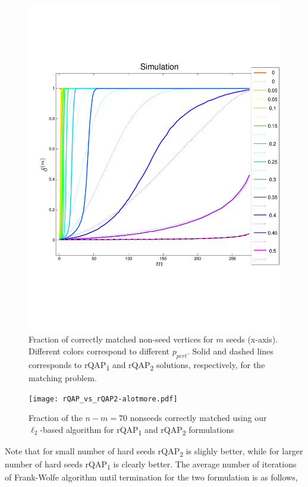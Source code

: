 \documentclass[12pt,oneside,final]{thesis}\usepackage[]{graphicx}\usepackage[]{color}
\begin{document}
\begin{figure}
 \centering
  \caption{ Fraction of correctly matched non-seed vertices for $m$ seeds (x-axis). Different colors correspond to different  $p_{pert}$. Solid and dashed lines corresponds to rQAP\textsubscript{1} and rQAP\textsubscript{2} solutions, respectively, for the matching problem.
 \label{rqap2}}
 \includegraphics[width=1.2\textwidth]{sim_bitflip_rqap2_300_hsv.pdf}
\end{figure}

\begin{figure}
 \centering
  \caption{Fraction of the $n-m=70$ nonseeds correctly matched using our $\ell_2$-based algorithm for rQAP\textsubscript{1} and rQAP\textsubscript{2} formulations
 \label{figell2}}
 \texttt{[image: rQAP\_vs\_rQAP2-alotmore.pdf]}
\end{figure}
Note that for small number of hard seeds rQAP\textsubscript{2} is slighly better, while for larger number of hard seeds rQAP\textsubscript{1} is clearly better. The average number of iterations of Frank-Wolfe algorithm until termination for the two formulation is as follows,
\end{document}
